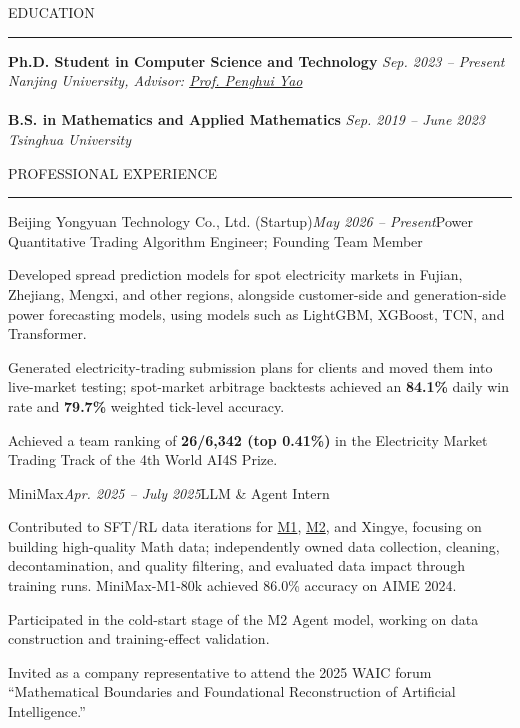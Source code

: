 \documentclass{resume_tsinghua} %
\renewenvironment{rSection}[1]{
\sectionskip
\textcolor{TsinghuaPurple}{\MakeUppercase{#1}}
\sectionlineskip
\hrule
\begin{list}{}{
\setlength{\leftmargin}{0em}
}
\item[]
}{
\end{list}
}
\renewcommand{\sectionlineskip}{\smallskip}
\begin{document}
\fontsize{10.5}{12.5}\selectfont
\setlength{\parskip}{4pt}

\begin{rSection}{Education}

{\bf Ph.D. Student in Computer Science and Technology} \hfill {\em Sep. 2023 -- Present}
\\
\textit{Nanjing University, Advisor: \href{http://penghuiyao.info/}{Prof. Penghui Yao}}
\\
\\
{\bf B.S. in Mathematics and Applied Mathematics} \hfill {\em Sep. 2019 -- June 2023}
\\
\textit{Tsinghua University}

\end{rSection}

\begin{rSection}{Professional Experience}
\begin{rSubsection}{Beijing Yongyuan Technology Co., Ltd. (Startup)}{\em May 2026 -- Present}{Power Quantitative Trading Algorithm Engineer; Founding Team Member}{}
  \item Developed spread prediction models for spot electricity markets in Fujian, Zhejiang, Mengxi, and other regions, alongside customer-side and generation-side power forecasting models, using models such as LightGBM, XGBoost, TCN, and Transformer.
  \item Generated electricity-trading submission plans for clients and moved them into live-market testing; spot-market arbitrage backtests achieved an \textbf{84.1\%} daily win rate and \textbf{79.7\%} weighted tick-level accuracy.
  \item Achieved a team ranking of \textbf{26/6,342 (top 0.41\%)} in the Electricity Market Trading Track of the 4th World AI4S Prize.
\end{rSubsection}
\begin{rSubsection}{MiniMax}{\em Apr. 2025 -- July 2025}{LLM \& Agent Intern}{}
  \item Contributed to SFT/RL data iterations for \href{https://huggingface.co/MiniMaxAI/MiniMax-M1}{M1}, \href{https://huggingface.co/MiniMaxAI/MiniMax-M2}{M2}, and Xingye, focusing on building high-quality Math data; independently owned data collection, cleaning, decontamination, and quality filtering, and evaluated data impact through training runs. MiniMax-M1-80k achieved 86.0\% accuracy on AIME 2024.
  \item Participated in the cold-start stage of the M2 Agent model, working on data construction and training-effect validation.
  \item Invited as a company representative to attend the 2025 WAIC forum ``Mathematical Boundaries and Foundational Reconstruction of Artificial Intelligence.''
\end{rSubsection}


\end{rSection}
\end{document}
